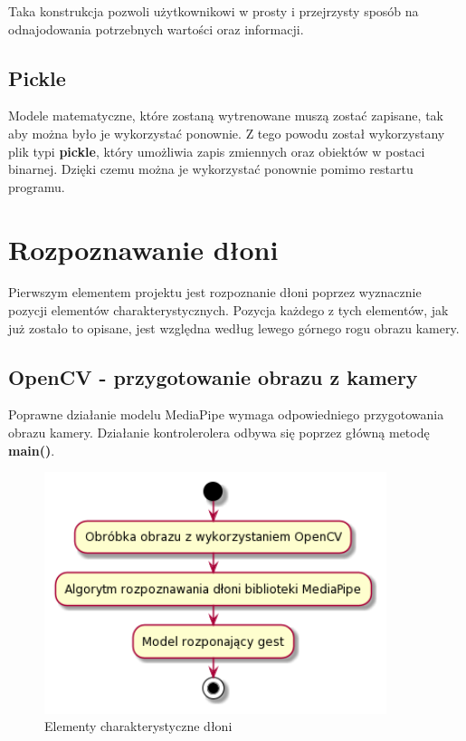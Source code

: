 \quad Taka konstrukcja pozwoli użytkownikowi w prosty i przejrzysty sposób na odnajodowania potrzebnych wartości oraz informacji. 

\subsection{Pickle}
\quad Modele matematyczne, które zostaną wytrenowane muszą zostać zapisane, tak aby można było je wykorzystać ponownie. Z tego powodu został wykorzystany plik typi \textbf{pickle}, który umożliwia zapis zmiennych oraz obiektów w postaci binarnej. Dzięki czemu można je wykorzystać ponownie pomimo restartu programu. 

\section{Rozpoznawanie dłoni}

\quad Pierwszym elementem projektu jest rozpoznanie dłoni poprzez wyznacznie pozycji elementów charakterystycznych. Pozycja każdego z tych elementów, jak już zostało to opisane, jest względna według lewego górnego rogu obrazu kamery. 



\subsection{OpenCV - przygotowanie obrazu z kamery}

\quad Poprawne działanie modelu MediaPipe wymaga odpowiedniego przygotowania obrazu kamery. Działanie kontrolerolera odbywa się poprzez główną metodę \textbf{main()}.

\begin{figure}[H]
    \begin{center}
        \includegraphics[width=10cm]{../images/image_processing.png}
        \caption{Elementy charakterystyczne dłoni}
    \end{center}
\end{figure}

